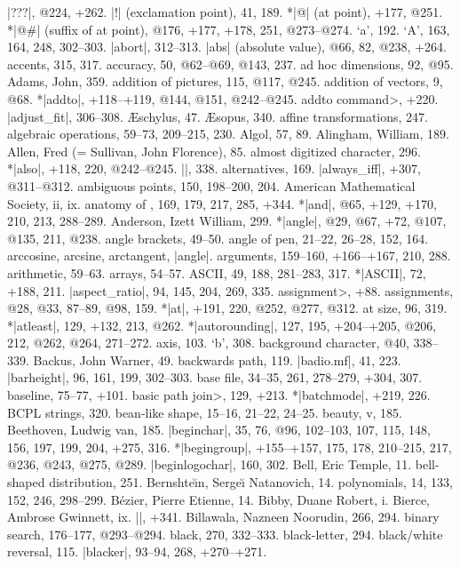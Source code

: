 |???|, @224, +262.
|!| (exclamation point), 41, 189.
*|@| (at point), +177, @251.
*|@#| (suffix of at point), @176, +177, +178, 251, @273--@274.
\newletter
`a', 192.
`A', 163, 164, 248, 302--303.
|abort|, 312--313.
|abs| (absolute value), @66, 82, @238, +264.
accents, 315, 317.
accuracy, 50, @62--@69, @143, 237.
ad hoc dimensions, 92, @95.
Adams, John, 359.
addition of pictures, 115, @117, @245.
addition of vectors, 9, @68.
*|addto|, +118--+119, @144, @151, @242--@245.
\<addto command>, +220.
|adjust_fit|, 306--308.
{\AE}schylus, 47.
{\AE}sopus, 340.
affine transformations, 247.
algebraic operations, 59--73, 209--215, 230.
Algol, 57, 89.
Alingham, William, 189.
Allen, Fred (= Sullivan, John Florence), 85.
almost digitized character, 296.
*|also|, +118, 220, @242--@245.
|\alternation|, 338.
alternatives, 169.
|always_iff|, +307, @311--@312.
ambiguous points, 150, 198--200, 204.
American Mathematical Society, ii, ix.
anatomy of \MF, 169, 179, 217, 285, +344.
*|and|, @65, +129, +170, 210, 213, 288--289.
Anderson, Izett William, 299.
*|angle|, @29, @67, +72, @107, @135, 211, @238.
angle brackets, 49--50.
angle of pen, 21--22, 26--28, 152, 164.
arccosine, arcsine, arctangent, \see |angle|.
arguments, 159--160, +166--+167, 210, 288.
arithmetic, 59--63.
arrays, 54--57.
ASCII, 49, 188, 281--283, 317.
*|ASCII|, 72, +188, 211.
|aspect_ratio|, 94, 145, 204, 269, 335.
\<assignment>, +88.
assignments, @28, @33, 87--89, @98, 159.
*|at|, +191, 220, @252, @277, @312.
at size, 96, 319.
*|atleast|, 129, +132, 213, @262.
*|autorounding|, 127, 195, +204--+205, @206, 212, @262, @264, 271--272.
axis, 103.
\newletter
`b', 308.
background character, @40, 338--339.
Backus, John Warner, 49.
backwards path, 119.
|badio.mf|, 41, 223.
|barheight|, 96, 161, 199, 302--303.
base file, 34--35, 261, 278--279, +304, 307.
baseline, 75--77, +101.
\<basic path join>, 129, +213.
*|batchmode|, +219, 226.
BCPL strings, 320.
bean-like shape, 15--16, 21--22, 24--25.
beauty, v, 185.
Beethoven, Ludwig van, 185.
|beginchar|, 35, 76, @96, 102--103, 107, 115, 148, 156, 197, 199, 204,
 +275, 316.
*|begingroup|, +155--+157, 175, 178, 210--215, 217, @236, @243, @275, @289.
|beginlogochar|, 160, 302.
Bell, Eric Temple, 11.
bell-shaped distribution, 251.
Bernshte{\u\i}n, Serge{\u\i} \thinspace Natanovich, 14.
\sub polynomials, 14, 133, 152, 246, 298--299.
B\'ezier, Pierre Etienne, 14.
Bibby, Duane Robert, i.
Bierce, Ambrose Gwinnett, ix.
|\bigtest|, +341.
Billawala, Nazneen Noorudin, 266, 294.
binary search, 176--177, @293--@294.
black, 270, 332--333.
black-letter, 294.
black/white reversal, 115.
|blacker|, 93--94, 268, +270--+271.
